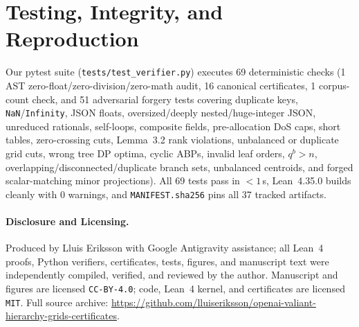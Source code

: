 \documentclass[10pt,twocolumn]{article}
\begin{document}
\section{Testing, Integrity, and Reproduction}
Our pytest suite (\texttt{tests/test\_verifier.py}) executes 69 deterministic checks (1 AST zero-float/zero-division/zero-math audit, 16 canonical certificates, 1 corpus-count check, and 51 adversarial forgery tests covering duplicate keys, \texttt{NaN}/\texttt{Infinity}, JSON floats, oversized/deeply nested/huge-integer JSON, unreduced rationals, self-loops, composite fields, pre-allocation DoS caps, short tables, zero-crossing cuts, Lemma~3.2 rank violations, unbalanced or duplicate grid cuts, wrong tree DP optima, cyclic ABPs, invalid leaf orders, $q^b>n$, overlapping/disconnected/duplicate branch sets, unbalanced centroids, and forged scalar-matching minor projections). All 69 tests pass in $<1$\,s, Lean~4.35.0 builds cleanly with 0 warnings, and \texttt{MANIFEST.sha256} pins all 37 tracked artifacts.

\paragraph{Disclosure and Licensing.}
Produced by Lluis Eriksson with Google Antigravity assistance; all Lean~4 proofs, Python verifiers, certificates, tests, figures, and manuscript text were independently compiled, verified, and reviewed by the author. Manuscript and figures are licensed \texttt{CC-BY-4.0}; code, Lean~4 kernel, and certificates are licensed \texttt{MIT}. Full source archive: \url{https://github.com/lluiseriksson/openai-valiant-hierarchy-grids-certificates}.



\end{document}
